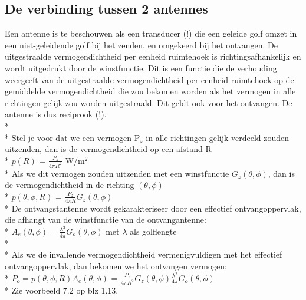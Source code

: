 \documentclass[10pt]{article}
\begin{document}
\subsection{De verbinding tussen 2 antennes}
Een antenne is te beschouwen als een transducer (!) die een geleide golf omzet in een niet-geleidende golf bij het zenden, en omgekeerd bij het ontvangen. De uitgestraalde vermogendichtheid per eenheid ruimtehoek is richtingsafhankelijk en wordt uitgedrukt door de winstfunctie. Dit is een functie die de verhouding weergeeft van de uitgestraalde vermogendichtheid per eenheid ruimtehoek op de gemiddelde vermogendichtheid die zou bekomen worden als het vermogen in alle richtingen gelijk zou worden uitgestraald. Dit geldt ook voor het ontvangen. De antenne is dus reciprook (!).\\*\\*
Stel je voor dat we een vermogen P$_z$ in alle richtingen gelijk verdeeld zouden uitzenden, dan is de vermogendichtheid op een afstand R\\*
$p(R)$ = $\frac{P_z}{4\pi R^2}$ W/m$^2$\\*
Als we dit vermogen zouden uitzenden met een winstfunctie $G_z(\theta,\phi)$, dan is de vermogendichtheid in de richting $(\theta,\phi)$\\*
$p(\theta, \phi, R)$ = $\frac{P_z}{4\pi R}G_z(\theta, \phi)$\\*
De ontvangstantenne wordt gekarakteriseer door een effectief ontvangoppervlak, die afhangt van de winstfunctie van de ontvangantenne:\\*
$A_e(\theta, \phi) = \frac{\lambda^2}{4\pi}G_o(\theta, \phi)$ met $\lambda$ als golflengte\\*\\*
Als we de invallende vermogendichtheid vermenigvuldigen met het effectief ontvangoppervlak, dan bekomen we het ontvangen vermogen:\\*
$P_o = p(\theta, \phi, R)A_e(\theta, \phi)$ = $\frac{P_z}{4\pi R^2}G_z(\theta, \phi)\frac{\lambda^2}{4\pi}G_o(\theta, \phi)$\\*
{\scriptsize Zie voorbeeld 7.2 op blz 1.13.}
\end{document}
